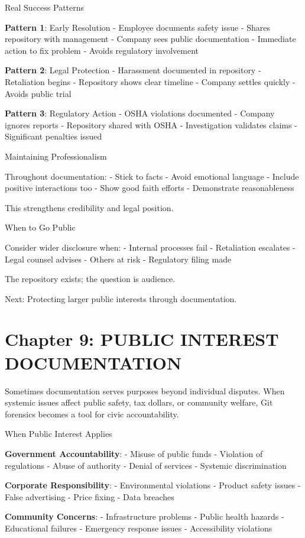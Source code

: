 Real Success Patterns

\textbf{Pattern 1}: Early Resolution - Employee documents safety issue -
Shares repository with management - Company sees public documentation -
Immediate action to fix problem - Avoids regulatory involvement

\textbf{Pattern 2}: Legal Protection - Harassment documented in
repository - Retaliation begins - Repository shows clear timeline -
Company settles quickly - Avoids public trial

\textbf{Pattern 3}: Regulatory Action - OSHA violations documented -
Company ignores reports - Repository shared with OSHA - Investigation
validates claims - Significant penalties issued

Maintaining Professionalism

Throughout documentation: - Stick to facts - Avoid emotional language -
Include positive interactions too - Show good faith efforts -
Demonstrate reasonableness

This strengthens credibility and legal position.

When to Go Public

Consider wider disclosure when: - Internal processes fail - Retaliation
escalates - Legal counsel advises - Others at risk - Regulatory filing
made

The repository exists; the question is audience.

Next: Protecting larger public interests through documentation.

\section{Chapter 9: PUBLIC INTEREST
DOCUMENTATION}\label{chapter-9-public-interest-documentation}

Sometimes documentation serves purposes beyond individual disputes. When
systemic issues affect public safety, tax dollars, or community welfare,
Git forensics becomes a tool for civic accountability.

When Public Interest Applies

\textbf{Government Accountability}: - Misuse of public funds - Violation
of regulations - Abuse of authority - Denial of services - Systemic
discrimination

\textbf{Corporate Responsibility}: - Environmental violations - Product
safety issues - False advertising - Price fixing - Data breaches

\textbf{Community Concerns}: - Infrastructure problems - Public health
hazards - Educational failures - Emergency response issues -
Accessibility violations


